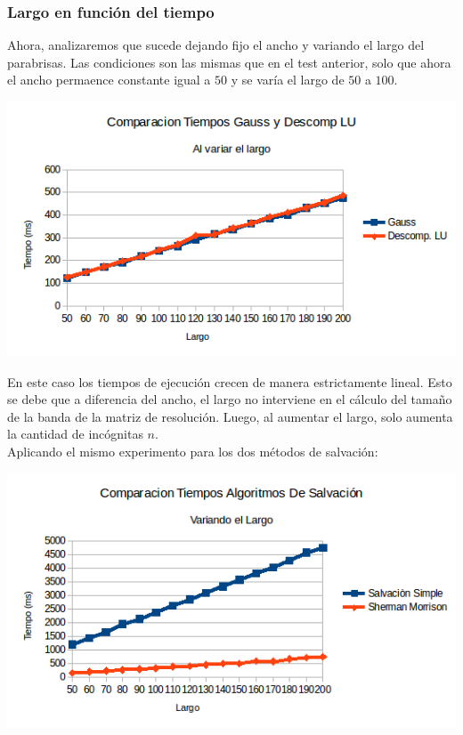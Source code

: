 \subsubsection{Largo en función del tiempo}
Ahora, analizaremos que sucede dejando fijo el ancho y variando el largo del parabrisas. Las condiciones son las mismas que en el test anterior, solo que ahora el ancho permaence constante igual a $50$ y se varía el largo de $50$ a $100$.

\begin{center}
 \includegraphics[width=400pt]{imagenes/testeo/largoGauss.png}
\end{center}

En este caso los tiempos de ejecución crecen de manera estrictamente lineal. Esto se debe que a diferencia del ancho, el largo no interviene en el cálculo del tamaño de la banda de la matriz de resolución. Luego, al aumentar el largo, solo aumenta la cantidad de incógnitas $n$.
\\
Aplicando el mismo experimento para los dos métodos de salvación:

\begin{center}
 \includegraphics[width=400pt]{imagenes/testeo/largoSalv.png}
\end{center}

